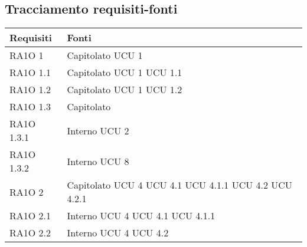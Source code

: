 \subsection{Tracciamento requisiti-fonti}
      \begin{center}
      \bgroup
      \def\arraystretch{1.8}
      \begin{longtable}{ | p{5cm} | p{5cm} |}
    
      \cellcolor[gray]{0.9} \textbf{Requisiti} & \cellcolor[gray]{0.9} \textbf{Fonti} \\ \hline       
        RA1O 1 &  Capitolato \newline  UCU 1 \newline  \\ \hline      
        RA1O 1.1 &  Capitolato \newline  UCU 1 \newline  UCU 1.1 \newline  \\ \hline      
        RA1O 1.2 &  Capitolato \newline  UCU 1 \newline  UCU 1.2 \newline  \\ \hline      
        RA1O 1.3 &  Capitolato \newline  \\ \hline      
        RA1O 1.3.1 &  Interno \newline  UCU 2 \newline  \\ \hline      
        RA1O 1.3.2 &  Interno \newline  UCU 8 \newline  \\ \hline      
        RA1O 2 &  Capitolato \newline  UCU 4 \newline  UCU 4.1 \newline  UCU 4.1.1 \newline  UCU 4.2 \newline  UCU 4.2.1 \newline  \\ \hline      
        RA1O 2.1 &  Interno \newline  UCU 4 \newline  UCU 4.1 \newline  UCU 4.1.1 \newline  \\ \hline      
        RA1O 2.2 &  Interno \newline  UCU 4 \newline  UCU 4.2 \newline  \\ \hline      

\end{longtable}
\end{center}
